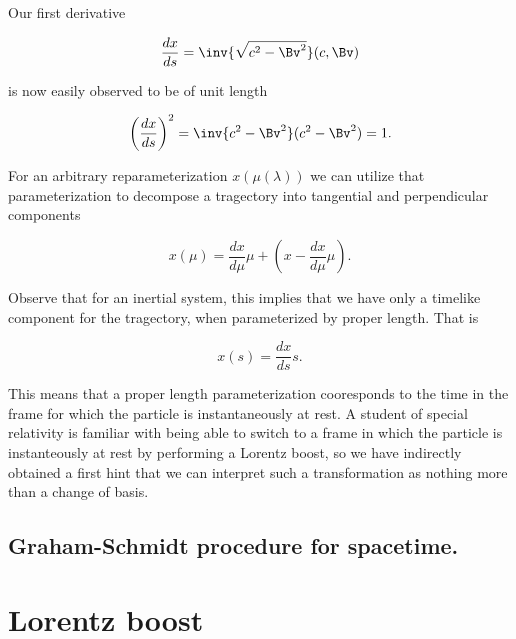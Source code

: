 Our first derivative

\begin{equation}\label{eqn:grahamSchmidtLorentz:500}
\frac{dx}{ds} = \inv{\sqrt{c^2 - \Bv^2}} (c, \Bv) 
\end{equation}

is now easily observed to be of unit length 

\begin{equation}\label{eqn:grahamSchmidtLorentz:520}
\left( \frac{dx}{ds} \right)^2 = \inv{c^2 - \Bv^2} (c^2 - \Bv^2) = 1.
\end{equation}

For an arbitrary reparameterization $x(\mu(\lambda))$ we can utilize that parameterization to decompose a tragectory into tangential and perpendicular components

\begin{equation}\label{eqn:grahamSchmidtLorentz:540}
x(\mu) = \frac{dx}{d\mu} \mu + \left( x - \frac{dx}{d\mu} \mu \right).
\end{equation}

Observe that for an inertial system, this implies that we have only a timelike component for the tragectory, when parameterized by proper length.  That is

\begin{equation}\label{eqn:grahamSchmidtLorentz:n}
x(s) = \frac{dx}{ds} s.
\end{equation}

This means that a proper length parameterization cooresponds to the time in the frame for which the particle is instantaneously at rest.  A student of special relativity is familiar with being able to switch to a frame in which the particle is instanteously at rest by performing a Lorentz boost, so we have indirectly obtained a first hint that we can interpret such a transformation as nothing more than a change of basis.

\subsection{Graham-Schmidt procedure for spacetime.}

\section{Lorentz boost}


\EndArticle
